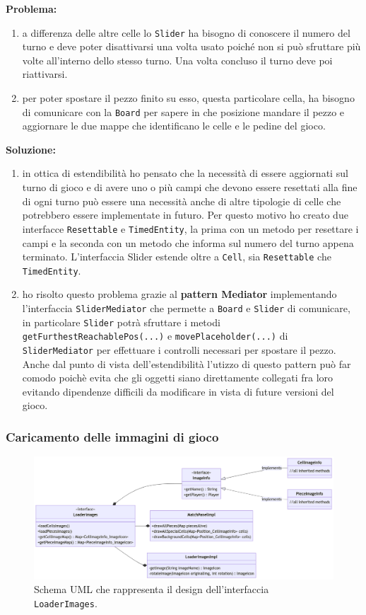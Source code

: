 \documentclass[a4paper,12pt]{report}
\begin{document}
\textbf{Problema:}
\begin{enumerate}
\item a differenza delle altre celle lo \texttt{Slider} ha bisogno di conoscere il numero del turno e deve poter disattivarsi una volta usato poiché non si può sfruttare più volte all’interno dello stesso turno. Una volta concluso il turno deve poi riattivarsi.
\item per poter spostare il pezzo finito su esso, questa particolare cella, ha bisogno di comunicare con la \texttt{Board} per sapere in che posizione mandare il pezzo e aggiornare le due mappe che identificano le celle e le pedine del gioco.
\end{enumerate}
\textbf{Soluzione:} 
\begin{enumerate}
\item in ottica di estendibilità ho pensato che la necessità di essere aggiornati sul turno di gioco e di avere uno o più campi che devono essere resettati alla fine di ogni turno può essere una necessità anche di altre tipologie di celle che potrebbero essere implementate in futuro. Per questo motivo ho creato due interfacce \texttt{Resettable} e \texttt{TimedEntity}, la prima con un metodo per resettare i campi e la seconda con un metodo che informa sul numero del turno appena terminato. L'interfaccia Slider estende oltre a \texttt{Cell}, sia \texttt{Resettable} che \texttt{TimedEntity}.
\item ho risolto questo problema grazie al  \textbf{pattern Mediator} implementando l’interfaccia \texttt{SliderMediator} che permette a \texttt{Board} e \texttt{Slider} di comunicare, in particolare \texttt{Slider} potrà sfruttare i metodi
\texttt{getFurthestReachablePos(...)} e \texttt{movePlaceholder(...)} di \texttt{SliderMediator} per effettuare i controlli necessari per spostare il pezzo. Anche dal punto di vista dell’estendibilità l’utizzo di questo pattern può far comodo poichè evita che gli oggetti siano direttamente collegati fra loro evitando dipendenze difficili da modificare in vista di future versioni del gioco.
\end{enumerate}

\subsubsection{Caricamento delle immagini di gioco}

\begin{figure}[H]
\centering
\includegraphics[width=\textwidth]{images/loader-images.png}
\caption{Schema UML che rappresenta il design dell'interfaccia \texttt{LoaderImages}.}
\label{images:loader-images}
\end{figure}
\end{document}
